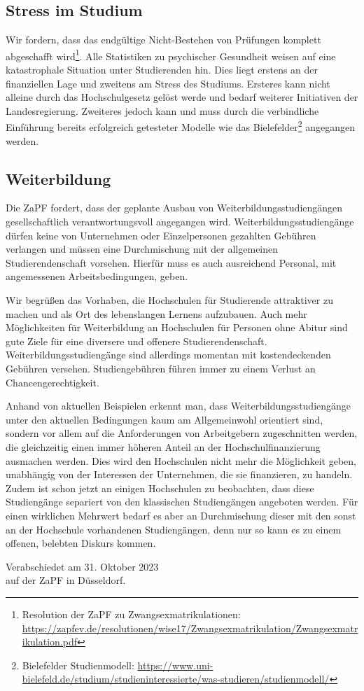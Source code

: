\documentclass[DIV=calc]{scrartcl}
\begin{document}
\subsection*{Stress im Studium}
Wir fordern, dass das endgültige Nicht-Bestehen von Prüfungen komplett abgeschafft wird\footnote{Resolution der ZaPF zu Zwangsexmatrikulationen: \url{https://zapfev.de/resolutionen/wise17/Zwangsexmatrikulation/Zwangsexmatrikulation.pdf}}. Alle Statistiken zu psychischer Gesundheit weisen auf eine katastrophale Situation unter Studierenden hin. Dies liegt erstens an der finanziellen Lage und zweitens am Stress des Studiums. Ersteres kann nicht alleine durch das Hochschulgesetz gelöst werde und bedarf weiterer Initiativen der Landesregierung. Zweiteres jedoch kann und muss durch die verbindliche Einführung bereits erfolgreich getesteter Modelle wie das Bielefelder\footnote{Bielefelder Studienmodell: \url{https://www.uni-bielefeld.de/studium/studieninteressierte/was-studieren/studienmodell/}} angegangen werden.

\subsection*{Weiterbildung}

Die ZaPF fordert, dass der geplante Ausbau von Weiterbildungsstudiengängen gesellschaftlich verantwortungsvoll angegangen wird. Weiterbildungsstudiengänge dürfen keine von Unternehmen oder Einzelpersonen gezahlten Gebühren verlangen und müssen eine Durchmischung mit der allgemeinen Studierendenschaft vorsehen. Hierfür muss es auch ausreichend Personal, mit angemessenen Arbeitsbedingungen, geben.

Wir begrüßen das Vorhaben, die Hochschulen für Studierende attraktiver zu machen und als Ort des lebenslangen Lernens aufzubauen. Auch mehr Möglichkeiten für Weiterbildung an Hochschulen für Personen ohne Abitur sind gute Ziele für eine diversere und offenere Studierendenschaft. Weiterbildungsstudiengänge sind allerdings momentan mit kostendeckenden Gebühren versehen. Studiengebühren führen immer zu einem Verlust an Chancengerechtigkeit.

Anhand von aktuellen Beispielen erkennt man, dass Weiterbildungsstudiengänge unter den aktuellen Bedingungen kaum am Allgemeinwohl orientiert sind, sondern vor allem auf die Anforderungen von Arbeitgebern zugeschnitten werden, die gleichzeitig einen immer höheren Anteil an der Hochschulfinanzierung ausmachen werden. Dies wird den Hochschulen nicht mehr die Möglichkeit geben, unabhängig von der Interessen der Unternehmen, die sie finanzieren, zu handeln. Zudem ist schon jetzt an einigen Hochschulen zu beobachten, dass diese Studiengänge separiert von den klassischen Studiengängen angeboten werden. Für einen wirklichen Mehrwert bedarf es aber an Durchmischung dieser mit den sonst an der Hochschule vorhandenen Studiengängen, denn nur so kann es zu einem offenen, belebten Diskurs kommen.


%
\vfill
\begin{flushright}
	Verabschiedet am 31. Oktober 2023 \\
	auf der ZaPF in Düsseldorf.
\end{flushright}
\end{document}
